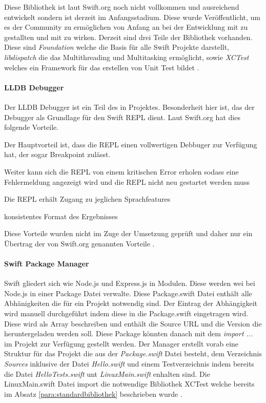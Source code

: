 Diese Bibliothek ist laut Swift.org noch nicht vollkommen und ausreichend entwickelt sondern ist derzeit im Anfangsstadium. Diese wurde Veröffentlicht, um es der Community zu ermöglichen von Anfang an bei der Entwicklung mit zu gestallten und mit zu wirken.  Derzeit sind drei Teile der Bibliothek vorhanden. Diese sind \textit{Foundation} welche die Basis für alle Swift Projekte darstellt, \textit{libdispatch} die das Multithreading und Multitasking ermöglicht, sowie \textit{XCTest} welches ein Framework für das erstellen von Unit Test bildet \parencite{swiftcore}.

\paragraph{LLDB Debugger}
Der LLDB Debugger ist ein Teil des in \label{para:clang} Projektes. Besonderheit hier ist, das der Debugger als Grundlage für den Swift REPL dient. Laut Swift.org hat dies folgende Vorteile.
\begin{compactenum}[a)]
\item Der Hauptvorteil ist, dass die REPL einen vollwertigen Debbuger zur Verfügung hat, der sogar Breakpoint zulässt.
\item Weiter kann sich die REPL von einem kritischen Error erholen sodass eine Fehlermeldung angezeigt wird und die REPL nicht neu gestartet werden muss
\item Die REPL erhält Zugang zu jeglichen Sprachfeatures
\item konsistentes Format des Ergebnisses
\end{compactenum}

Diese Vorteile wurden nicht im Zuge der Umsetzung geprüft und daher nur ein Übertrag der von Swift.org genannten Vorteile \parencite{swiftdebugger}.

\paragraph{Swift Package Manager}
Swift gliedert sich wie Node.js und Express.js in Modulen. Diese werden wei bei Node.js in einer Package Datei verwalte. Diese Package.swift Datei enthält alle Abhänigkeiten die für ein Projekt notwendig sind. Der Eintrag der Abhängigkeit wird manuell durchgeführt indem diese in die Package.swift eingetragen wird. Diese wird als Array beschreiben und enthält die Source URL und die Version die heruntergeladen werden soll. Diese Package könnten danach mit dem \textit{import ...} im Projekt zur Verfügung gestellt werden.
Der Manager erstellt vorab eine Struktur für das Projekt die aus der \textit{Package.swift} Datei besteht, dem Verzeichnis \textit{Sources} inklusive der Datei \textit{Hello.swift} und einem Testverzeichnis indem bereits die Datei \textit{HelloTests.swift} unt \textit{LinuxMain.swift} enhalten sind. Die LinuxMain.swift Datei import die notwendige Bibliothek XCTest welche bereits im Absatz \ref{para:standardbibliothek} beschrieben wurde \parencite{swiftpm}.


